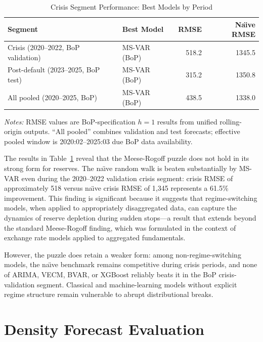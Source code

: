 \documentclass[12pt,a4paper]{article}
\begin{document}
\begin{table}[htbp]
\centering
\caption{Crisis Segment Performance: Best Models by Period}
\label{tab:crisis_segment}
\begin{tabular}{llrr}
\toprule
Segment & Best Model & RMSE & Na\"{\i}ve RMSE \\
\midrule
Crisis (2020--2022, BoP validation) & MS-VAR (BoP) & 518.2 & 1345.5 \\
Post-default (2023--2025, BoP test) & MS-VAR (BoP) & 315.2 & 1350.8 \\
All pooled (2020--2025, BoP) & MS-VAR (BoP) & 438.5 & 1338.0 \\
\bottomrule
\end{tabular}
\begin{tablenotes}
\small
\item \textit{Notes:} RMSE values are BoP-specification $h=1$ results from unified rolling-origin outputs. ``All pooled'' combines validation and test forecasts; effective pooled window is 2020:02--2025:03 due BoP data availability.
\end{tablenotes}
\end{table}

The results in Table~\ref{tab:crisis_segment} reveal that the Meese-Rogoff puzzle does not hold in its strong form for reserves. The na\"{\i}ve random walk is beaten substantially by MS-VAR even during the 2020--2022 validation crisis segment: crisis RMSE of approximately 518 versus na\"{\i}ve crisis RMSE of 1,345 represents a 61.5\% improvement. This finding is significant because it suggests that regime-switching models, when applied to appropriately disaggregated data, can capture the dynamics of reserve depletion during sudden stops---a result that extends beyond the standard Meese-Rogoff finding, which was formulated in the context of exchange rate models applied to aggregated fundamentals.

However, the puzzle does retain a weaker form: among non-regime-switching models, the na\"{\i}ve benchmark remains competitive during crisis periods, and none of ARIMA, VECM, BVAR, or XGBoost reliably beats it in the BoP crisis-validation segment. Classical and machine-learning models without explicit regime structure remain vulnerable to abrupt distributional breaks.

\section{Density Forecast Evaluation}
\end{document}
